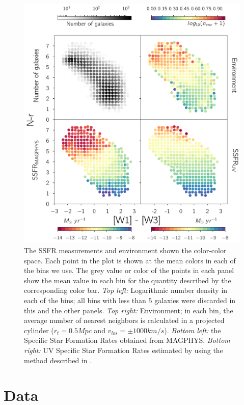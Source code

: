 \documentclass[iop]{emulateapj}
\begin{document}
\begin{figure}
    \centering
	\includegraphics[width = 16 cm, height = 16 cm]{panel_plot.pdf}
	\caption{The SSFR measurements and environment shown the color-color 
    space. Each point in the plot is shown at the mean colors in each of 
    the bins we use. The grey value or color of the points in each
    panel show the mean value in each bin for the quantity described 
    by the corresponding  color bar.
    \emph{Top left:} Logarithmic number density in each of the 
    bins; all bins with less than $5$ galaxies were discarded in this 
    and the other panels. \emph{Top right:} Environment; in each bin, 
    the average number of nearest neighbors is calculated in a 
    projected cylinder ($r_{t} = 0.5 Mpc$ and $v_{los} = \pm 1000 km/s$). 
    \emph{Bottom left:} the Specific Star Formation Rates obtained from 
    MAGPHYS. \emph{Bottom right:} UV Specific Star Formation Rates 
    estimated by using the method described in \citet{salim_uv_2007}.} 
\end{figure}

\section{Data}
\end{document}
